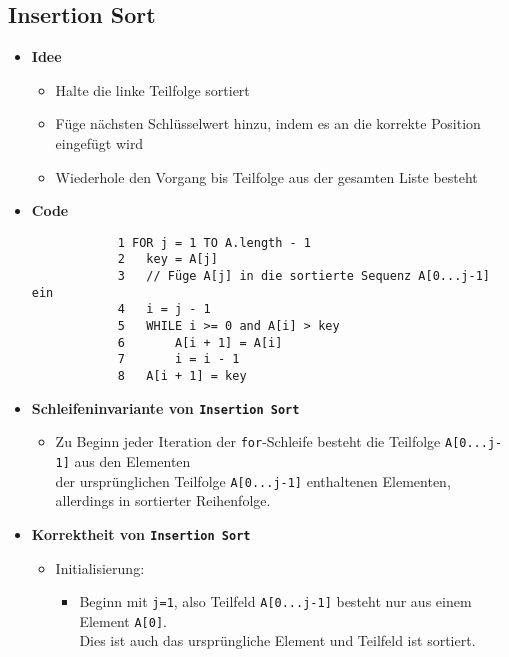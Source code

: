 \subsection{Insertion Sort}
    \begin{itemize}
        \item \textbf{Idee}
            \begin{itemize}
                \item Halte die linke Teilfolge sortiert
                \item Füge nächsten Schlüsselwert hinzu, indem es an die korrekte Position eingefügt wird
                \item Wiederhole den Vorgang bis Teilfolge aus der gesamten Liste besteht
            \end{itemize}
        
        \item \textbf{Code}
            \begin{verbatim}  
            1 FOR j = 1 TO A.length - 1
            2   key = A[j]
            3   // Füge A[j] in die sortierte Sequenz A[0...j-1] ein
            4   i = j - 1
            5   WHILE i >= 0 and A[i] > key
            6       A[i + 1] = A[i]
            7       i = i - 1
            8   A[i + 1] = key
            \end{verbatim}
        \item \textbf{Schleifeninvariante von \texttt{Insertion Sort}} {\label{insSortSiv}} 
            \begin{itemize}
                \item Zu Beginn jeder Iteration der \texttt{for}-Schleife besteht die Teilfolge \texttt{A[0...j-1]} aus den Elementen \\
                der ursprünglichen Teilfolge \texttt{A[0...j-1]} enthaltenen Elementen, allerdings in sortierter Reihenfolge.
            \end{itemize}

        \item \textbf{Korrektheit von \texttt{Insertion Sort}}
            \begin{itemize}
                \item Initialisierung:
                    \begin{itemize}
                        \item   Beginn mit \texttt{j=1}, also Teilfeld \texttt{A[0...j-1]} besteht nur aus einem Element \texttt{A[0]}. \\
                                Dies ist auch das ursprüngliche Element und Teilfeld ist sortiert.
                    \end{itemize}


\end{itemize}
\end{itemize}
